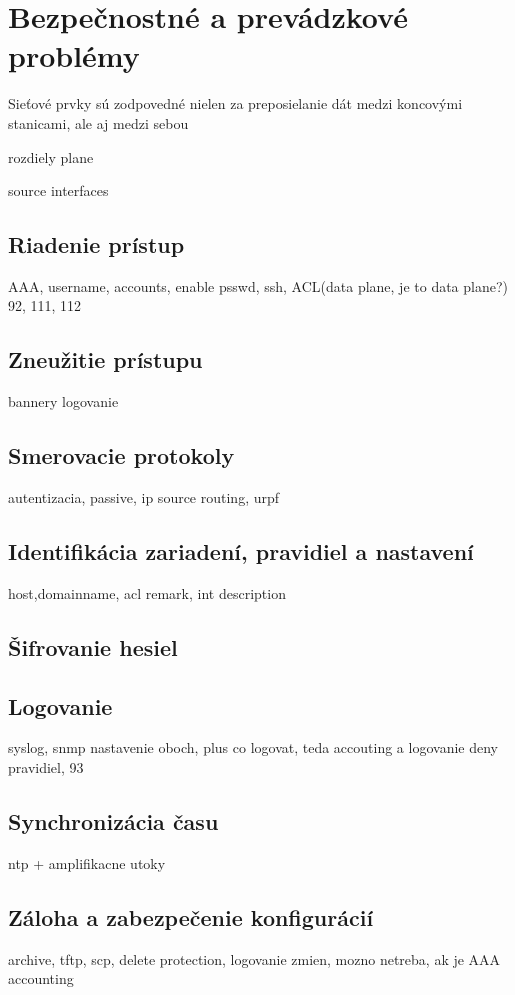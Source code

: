 \chapter{Bezpečnostné a prevádzkové problémy}
Sieťové prvky sú zodpovedné nielen za preposielanie dát medzi koncovými stanicami, ale aj medzi sebou

rozdiely plane

source interfaces

\section{Riadenie prístup}
AAA, username, accounts, enable psswd, ssh, ACL(data plane, je to data plane?) 92, 111, 112

\section{Zneužitie prístupu}
bannery logovanie

\section{Smerovacie protokoly}
autentizacia, passive, ip source routing, urpf


\section{Identifikácia zariadení, pravidiel a nastavení}
host,domainname, acl remark, int description

\section{Šifrovanie hesiel}

\section{Logovanie}
syslog, snmp nastavenie oboch, plus co logovat, teda accouting a logovanie deny pravidiel, 93

\section{Synchronizácia času}
ntp + amplifikacne utoky

\section{Záloha a zabezpečenie konfigurácií}
archive, tftp, scp, delete protection, logovanie zmien, mozno netreba, ak je AAA accounting
